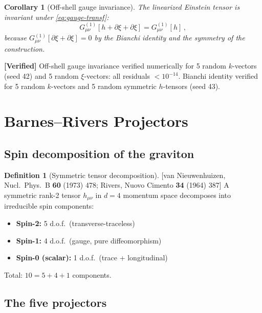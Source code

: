 \documentclass[12pt,a4paper]{article}
\newtheorem{corollary}[proposition]{Corollary}
\theoremstyle{definition}
\newtheorem{definition}[proposition]{Definition}
\theoremstyle{remark}
\newcommand{\fromlit}[1]{\textcolor{blue!70!black}{\textsf{[#1]}}}
\newcommand{\verified}[1]{%
  \par\smallskip\noindent
  \colorbox{green!10}{\parbox{\dimexpr\linewidth-2\fboxsep}{%
    \textcolor{green!50!black}{\textbf{[Verified]}} #1}}%
  \par\smallskip}
\begin{document}
\begin{corollary}[Off-shell gauge invariance]
\label{cor:gauge-inv}
The linearized Einstein tensor is invariant under
\eqref{eq:gauge-transf}:
\begin{equation}
  G_{\mu\nu}^{(1)}[h + \partial\xi + \partial\xi]
  = G_{\mu\nu}^{(1)}[h]\,,
\end{equation}
because $G_{\mu\nu}^{(1)}[\partial\xi + \partial\xi] = 0$ by the
Bianchi identity and the symmetry of the construction.
\end{corollary}

\verified{Off-shell gauge invariance verified numerically for 5 random
$k$-vectors (seed 42) and 5 random $\xi$-vectors: all residuals
$< 10^{-14}$.  Bianchi identity verified for 5 random $k$-vectors
and 5 random symmetric $h$-tensors (seed 43).}


\section{Barnes--Rivers Projectors}
\label{sec:barnes-rivers}

\subsection{Spin decomposition of the graviton}

\begin{definition}[Symmetric tensor decomposition]
\label{def:spin-decomposition}
\fromlit{van Nieuwenhuizen, Nucl.\ Phys.\ B \textbf{60} (1973) 478;
Rivers, Nuovo Cimento \textbf{34} (1964) 387}
A symmetric rank-2 tensor $h_{\mu\nu}$ in $d=4$ momentum space
decomposes into irreducible spin components:
\begin{itemize}[nosep]
  \item \textbf{Spin-2:} 5 d.o.f.\ (transverse-traceless)
  \item \textbf{Spin-1:} 4 d.o.f.\ (gauge, pure diffeomorphism)
  \item \textbf{Spin-0 (scalar):} 1 d.o.f.\ (trace + longitudinal)
\end{itemize}
Total: $10 = 5 + 4 + 1$ components.
\end{definition}


\subsection{The five projectors}
\end{document}
